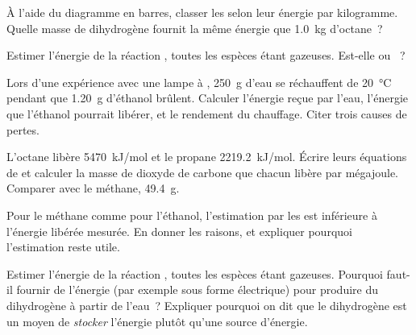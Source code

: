 \begin{exercise}[$\star\star$]\label{exo:g11:reaction-energy:10}
À l'aide du diagramme en barres, classer les  selon leur
énergie par kilogramme. Quelle masse de dihydrogène fournit la même
énergie que \qty{1.0}{kg} d'octane~?
\end{exercise}

\begin{exercise}[$\star\star$]\label{exo:g11:reaction-energy:11}
Estimer l'énergie de la réaction , toutes les
espèces étant gazeuses. Est-elle  ou ~?
\end{exercise}

\begin{exercise}[$\star\star\star$]\label{exo:g11:reaction-energy:12}
Lors d'une expérience avec une lampe à , \qty{250}{g} d'eau se
réchauffent de \qty{20}{\celsius} pendant que \qty{1.20}{g} d'éthanol
brûlent. Calculer l'énergie reçue par l'eau, l'énergie que l'éthanol
pourrait libérer, et le rendement du chauffage. Citer trois causes de
pertes.
\end{exercise}

\begin{exercise}[$\star\star\star$]\label{exo:g11:reaction-energy:13}
L'octane libère \qty{5470}{kJ/mol} et le propane \qty{2219.2}{kJ/mol}.
Écrire leurs équations de  et calculer la masse de dioxyde de
carbone que chacun libère par mégajoule. Comparer avec le méthane,
\qty{49.4}{g}.
\end{exercise}

\begin{exercise}[$\star\star\star$]\label{exo:g11:reaction-energy:14}
Pour le méthane comme pour l'éthanol, l'estimation par les  est inférieure à l'énergie libérée mesurée. En donner les
raisons, et expliquer pourquoi l'estimation reste utile.
\end{exercise}

\begin{exercise}[$\star\star\star$]\label{exo:g11:reaction-energy:15}
Estimer l'énergie de la réaction , toutes les
espèces étant gazeuses. Pourquoi faut-il fournir de l'énergie (par
exemple sous forme électrique) pour produire du dihydrogène à partir de
l'eau~? Expliquer pourquoi on dit que le dihydrogène est un moyen de
\emph{stocker} l'énergie plutôt qu'une source d'énergie.
\end{exercise}

